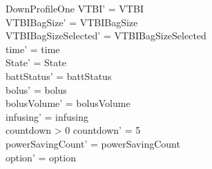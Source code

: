 \begin{schema}{DownProfileOne}
	VTBI' = VTBI\\
	VTBIBagSize' = VTBIBagSize\\ VTBIBagSizeSelected' = VTBIBagSizeSelected\\
	time' = time\\ 
	\pagebreak
	State' = State\\
	battStatus' = battStatus\\
	bolus' = bolus\\
	bolusVolume' = bolusVolume\\
	infusing' = infusing\\
	countdown > 0 \land countdown' = 5\\
	powerSavingCount' = powerSavingCount\\ option' = option\\
\end{schema}

